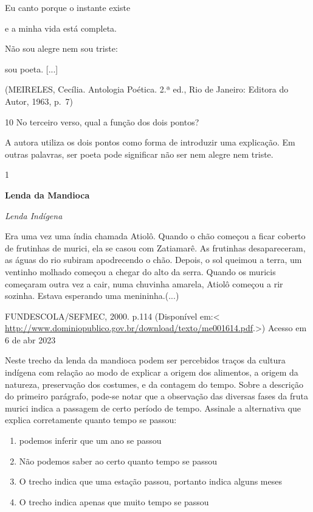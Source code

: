 {{\begin{escolha}
Eu canto porque o instante existe

e a minha vida está completa.

Não sou alegre nem sou triste:

sou poeta. {[}...{]}

(MEIRELES, Cecília. Antologia Poética. 2.ª ed., Rio de Janeiro: Editora
do Autor, 1963, p.~7)

\num{10} No terceiro verso, qual a função dos dois pontos?

A autora utiliza os dois pontos como forma de introduzir uma explicação.
Em outras palavras, ser poeta pode significar não ser nem alegre nem
triste.


\num{1}

\textbf{Lenda da Mandioca}

\emph{Lenda Indígena}

Era uma vez uma índia chamada Atiolô. Quando o chão começou a ficar
coberto de frutinhas de murici, ela se casou com Zatiamarê. As frutinhas
desapareceram, as águas do rio subiram apodrecendo o chão. Depois, o sol
queimou a terra, um ventinho molhado começou a chegar do alto da serra.
Quando os muricis começaram outra vez a cair, numa chuvinha amarela,
Atiolô começou a rir sozinha. Estava esperando uma menininha.(...)

\begin{description}
\tightlist
\item[Alfabetização : livro do aluno / Ana Rosa Abreu ... {[}et al.{]}
Brasília]
FUNDESCOLA/SEFMEC, 2000. p.114 (Disponível em:\textless{}
\url{http://www.dominiopublico.gov.br/download/texto/me001614.pdf}.\textgreater)
Acesso em 6 de abr 2023
\end{description}

Neste trecho da lenda da mandioca podem ser percebidos traços da cultura
indígena com relação ao modo de explicar a origem dos alimentos, a
origem da natureza, preservação dos costumes, e da contagem do tempo.
Sobre a descrição do primeiro parágrafo, pode-se notar que a observação
das diversas fases da fruta murici indica a passagem de certo período de
tempo. Assinale a alternativa que explica corretamente quanto tempo se
passou:

\begin{enumerate}
\def\labelenumi{\alph{enumi})}
\item
  podemos inferir que um ano se passou
\item
  Não podemos saber ao certo quanto tempo se passou
\item
  O trecho indica que uma estação passou, portanto indica alguns meses
\item
  O trecho indica apenas que muito tempo se passou
\end{enumerate}


\end{escolha}}}
